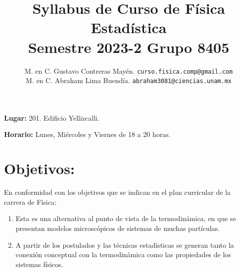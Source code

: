 

\author{M. en C. Gustavo Contreras Mayén. \texttt{curso.fisica.comp@gmail.com}\\
M. en C. Abraham Lima Buendía. \texttt{abraham3081@ciencias.unam.mx}}
\title{Syllabus de Curso de Física Estadística \\ {\large Semestre 2023-2 Grupo 8405}}
\date{ }

% 



\renewcommand\labelenumii{\theenumi.{\arabic{enumii}}}
\maketitle
\fontsize{12}{12}\selectfont

\textbf{Lugar: } 201. Edificio Yellizcalli.
\par
\textbf{Horario: } Lunes, Miércoles y Viernes de 18 a 20 horas.
\par
\par
\section{Objetivos:}

En conformidad con los objetivos que se indican en el plan curricular de la carrera de Física:
\begin{enumerate}
\item Esta es una alternativa al punto de vista de la termodinámica, en que se presentan modelos microscópicos de sistemas de muchas partículas.
\item A partir de los postulados y las técnicas estadísticas se generan tanto la conexión conceptual con la termodinámica como las propiedades de los sistemas físicos.
\end{enumerate}

